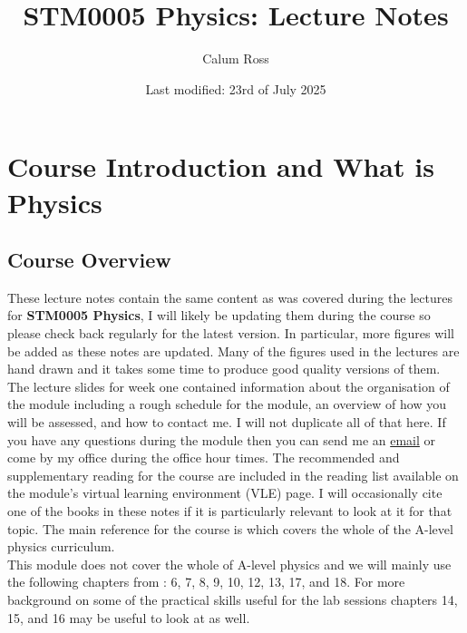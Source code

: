 \documentclass[a4paper,12pt]{book}
\begin{document}
\title{STM0005 Physics: Lecture Notes}
\author{Calum Ross}
\date{Last modified: 23rd of July 2025}
\maketitle %
\tableofcontents %

\chapter{Course Introduction and What is Physics}

\section{Course Overview}
These lecture notes contain the same content as was covered during the lectures for \textbf{STM0005 Physics}, I will likely be updating them during the course so please check back regularly for the latest version. In particular, more figures will be added as these notes are updated. Many of the figures used in the lectures are hand drawn and it takes some time to produce good quality versions of them.\\


The lecture slides for week one contained information about the organisation of the module including a rough schedule for the module, an overview of how you will be assessed, and  how to contact me. I will not duplicate all of that here. If you have any questions during the module then you can send me an \href{mailto:rossc@edgehill.ac.uk}{email} or come by my office during the office hour times. The recommended and supplementary reading for the course are included in the reading list available on the module's virtual learning environment (VLE) page. I will occasionally cite one of the books in these notes if it is particularly relevant to look at it for that topic. The main reference for the course is \citep{breithaupt2016aqa} which covers the whole of the A-level physics curriculum.\\

This module does not cover the whole of A-level physics and we will mainly use the following chapters from \citep{breithaupt2016aqa}: 6, 7, 8, 9, 10, 12, 13, 17, and 18. For more background on some of the practical skills useful for the lab sessions chapters 14, 15, and 16 may be useful to look at as well.
\end{document}
